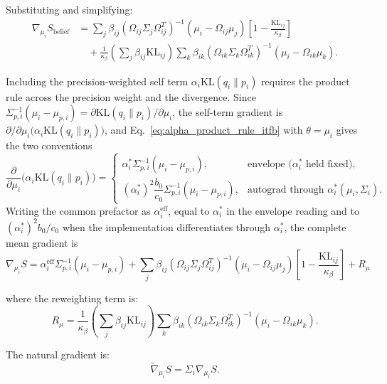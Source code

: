 \documentclass[11pt]{article}
\begin{document}
Substituting and simplifying:
\begin{align}
\nabla_{\mu_i} S_{\mathrm{belief}} &= \sum_j \beta_{ij} (\Omega_{ij}\Sigma_j\Omega_{ij}^T)^{-1}(\mu_i - \Omega_{ij}\mu_j) \left[1 - \frac{\mathrm{KL}_{ij}}{\kappa_\beta}\right] \nonumber \\
&\quad + \frac{1}{\kappa_\beta}\left(\sum_j \beta_{ij}\mathrm{KL}_{ij}\right) \sum_k \beta_{ik} (\Omega_{ik}\Sigma_k\Omega_{ik}^T)^{-1}(\mu_i - \Omega_{ik}\mu_k).
\end{align}

Including the precision-weighted self term $\alpha_i \mathrm{KL}(q_i \| p_i)$ requires the product rule across the precision weight and the divergence. Since $\Sigma_{p,i}^{-1}(\mu_i - \mu_{p,i}) = \partial \mathrm{KL}(q_i \| p_i)/\partial \mu_i$, the self-term gradient is $\partial/\partial\mu_i\bigl(\alpha_i \mathrm{KL}(q_i \| p_i)\bigr)$, and Eq.~\eqref{eq:alpha_product_rule_itfb} with $\theta = \mu_i$ gives the two conventions
\begin{equation}
\frac{\partial}{\partial \mu_i}\bigl(\alpha_i \mathrm{KL}(q_i \| p_i)\bigr) =
\begin{cases}
\alpha_i^* \Sigma_{p,i}^{-1}(\mu_i - \mu_{p,i}), & \text{envelope ($\alpha_i^*$ held fixed)}, \\[4pt]
(\alpha_i^*)^2 \dfrac{b_0}{c_0} \Sigma_{p,i}^{-1}(\mu_i - \mu_{p,i}), & \text{autograd through } \alpha_i^*(\mu_i, \Sigma_i).
\end{cases}
\end{equation}
Writing the common prefactor as $\alpha_i^{\mathrm{eff}}$, equal to $\alpha_i^*$ in the envelope reading and to $(\alpha_i^*)^2 b_0/c_0$ when the implementation differentiates through $\alpha_i^*$, the complete mean gradient is
\begin{equation}
\boxed{\nabla_{\mu_i} S = \alpha_i^{\mathrm{eff}}\Sigma_{p,i}^{-1}(\mu_i - \mu_{p,i}) + \sum_j \beta_{ij} (\Omega_{ij}\Sigma_j\Omega_{ij}^T)^{-1}(\mu_i - \Omega_{ij}\mu_j) \left[1 - \frac{\mathrm{KL}_{ij}}{\kappa_\beta}\right] + R_\mu}
\end{equation}

where the reweighting term is:
\begin{equation}
R_\mu = \frac{1}{\kappa_\beta}\left(\sum_j \beta_{ij}\mathrm{KL}_{ij}\right) \sum_k \beta_{ik} (\Omega_{ik}\Sigma_k\Omega_{ik}^T)^{-1}(\mu_i - \Omega_{ik}\mu_k).
\end{equation}

The natural gradient is:
\begin{equation}
\tilde{\nabla}_{\mu_i} S = \Sigma_i \nabla_{\mu_i} S.
\end{equation}
\end{document}
